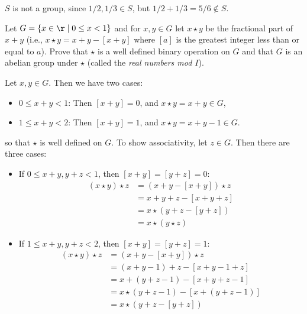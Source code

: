 \begin{problems}
\begin{sol}
\begin{problems}
            \item $S$ is not a group, since $1/2, 1/3 \in S$, but $1/2 + 1/3 = 5/6 \not\in S$. \qh
        \end{problems}
    \end{sol}
    \item Let $G = \{ x \in \r \mid 0 \le x < 1 \}$ and for $x, y \in G$ let $x \star y$ be the fractional part of $x + y$ (i.e., $x \star y = x + y - [x + y]$ where $[a]$ is the greatest integer less than or equal to $a$). Prove that $\star$ is a well defined binary operation on $G$ and that $G$ is an abelian group under $\star$ (called the \textit{real numbers mod $I$}).
    \begin{sol}
        Let $x, y \in G$. Then we have two cases:
        \begin{itemize}
            \item $0 \leq x + y < 1$: Then $[x + y] = 0$, and $x \star y = x + y \in G$,
            \item $1 \leq x + y < 2$: Then $[x + y] = 1$, and $x \star y = x + y - 1 \in G$.
        \end{itemize}
        so that $\star$ is well defined on $G$. To show associativity, let $z \in G$. Then there are three cases:
        \begin{itemize}
            \item If $0 \leq x + y, y + z < 1$, then $[x + y] = [y + z] = 0$:
            \begin{align*}
                (x \star y) \star z & = (x + y - [x + y]) \star z \\
                & = x + y + z - [x + y + z] \\
                & = x \star (y + z - [y + z]) \\
                & = x \star (y \star z)
            \end{align*}
            \item If $1 \leq  x + y, y + z < 2$, then $[x + y] = [y + z] = 1$:
            \begin{align*}
                (x \star y) \star z & = (x + y - [x + y]) \star z \\
                & = (x + y - 1) + z - [x + y - 1 + z] \\
                & = x + (y + z - 1) - [x + y + z - 1] \\
                & = x \star (y + z - 1) - [x + (y + z - 1)] \\
                & = x \star (y + z - [y + z]) \\

\end{align*}
\end{itemize}
\end{sol}
\end{problems}
